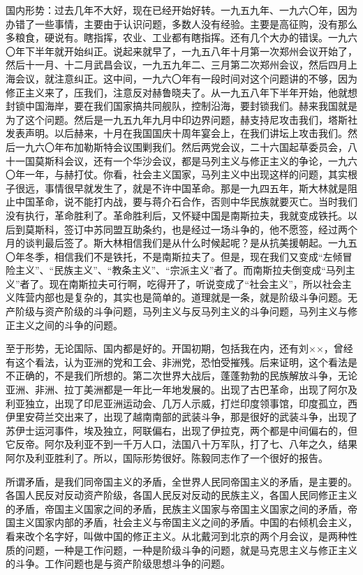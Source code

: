 国内形势：过去几年不大好，现在已经开始好转。一九五九年、一九六〇年，因为办错了一些事情，主要由于认识问题，多数人没有经验。主要是高征购，没有那么多粮食，硬说有。瞎指挥，农业、工业都有瞎指挥。还有几个大办的错误。一九六〇年下半年就开始纠正。说起来就早了，一九五八年十月第一次郑州会议开始了，然后十一月、十二月武昌会议，一九五九年二、三月第二次郑州会议，然后四月上海会议，就注意纠正。这中间，一九六〇年有一段时间对这个问题讲的不够，因为修正主义来了，压我们，注意反对赫鲁晓夫了。从一九五八年下半年开始，他就想封锁中国海岸，要在我们国家搞共同舰队，控制沿海，要封锁我们。赫来我国就是为了这个问题。然后是一九五九年九月中印边界问题，赫支持尼攻击我们，塔斯社发表声明。以后赫来，十月在我国国庆十周年宴会上，在我们讲坛上攻击我们。然后一九六〇年布加勒斯特会议围剿我们。然后两党会议，二十六国起草委员会，八十一国莫斯科会议，还有一个华沙会议，都是马列主义与修正主义的争论，一九六〇年一年，与赫打仗。你看，社会主义国家，马列主义中出现这样的问题，其实根子很远，事情很早就发生了，就是不许中国革命。那是一九四五年，斯大林就是阻止中国革命，说不能打内战，要与蒋介石合作，否则中华民族就要灭亡。当时我们没有执行，革命胜利了。革命胜利后，又怀疑中国是南斯拉夫，我就变成铁托。以后到莫斯科，签订中苏同盟互助条约，也是经过一场斗争的，他不愿签，经过两个月的谈判最后签了。斯大林相信我们是从什么时候起呢？是从抗美援朝起。一九五〇年冬季，相信我们不是铁托，不是南斯拉夫了。但是，现在我们又变成“左倾冒险主义”、“民族主义”、“教条主义”、“宗派主义”者了。而南斯拉夫倒变成“马列主义”者了。现在南斯拉夫可行啊，吃得开了，听说变成了“社会主义”，所以社会主义阵营内部也是复杂的，其实也是简单的。道理就是一条，就是阶级斗争问题。无产阶级与资产阶级的斗争问题，马列主义与反马列主义的斗争问题，马列主义与修正主义之间的斗争的问题。

至于形势，无论国际、国内都是好的。开国初期，包括我在内，还有刘××，曾经有这个看法，认为亚洲的党和工会、非洲党，恐怕受摧残。后来证明，这个看法是不正确的，不是我们所想的。第二次世界大战后，蓬蓬勃勃的民族解放斗争，无论亚洲、非洲、拉丁美洲都是一年比一年地发展的。出现了古巴革命，出现了阿尔及利亚独立，出现了印尼亚洲运动会、几万人示威，打烂印度领事馆，印度孤立，西伊里安荷兰交出来了，出现了越南南部的武装斗争，那是很好的武装斗争，出现了苏伊士运河事件，埃及独立，阿联偏右，出现了伊拉克，两个都是中间偏右的，但它反帝。阿尔及利亚不到一千万人口，法国八十万军队，打了七、八年之久，结果阿尔及利亚胜利了。所以，国际形势很好。陈毅同志作了一个很好的报告。

所谓矛盾，是我们同帝国主义的矛盾，全世界人民同帝国主义的矛盾，是主要的。各国人民反对反动资产阶级，各国人民反对反动的民族主义，各国人民同修正主义的矛盾，帝国主义国家之间的矛盾，民族主义国家与帝国主义国家之间的矛盾，帝国主义国家内部的矛盾，社会主义与帝国主义之间的矛盾。中国的右倾机会主义，看来改个名字好，叫做中国的修正主义。从北戴河到北京的两个月会议，是两种性质的问题，一种是工作问题，一种是阶级斗争的问题，就是马克思主义与修正主义的斗争。工作问题也是与资产阶级思想斗争的问题。

